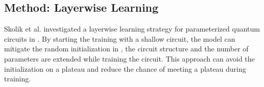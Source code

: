 \subsection{Method: Layerwise Learning}


Skolik et al. investigated a layerwise learning strategy for parameterized quantum circuits in \cite{skolikLayerwiseLearningQuantum2021}. 
By starting the training with a shallow circuit, the model can mitigate the random initialization in \cite{mccleanBarrenPlateausQuantum2018}, the circuit structure and the number of parameters are extended while training the circuit. This approach can avoid the initialization on a plateau and reduce the chance of meeting a plateau during training.